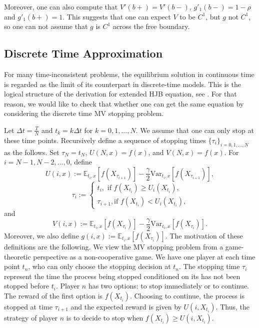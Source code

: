 \documentclass[11pt]{article}
\begin{document}
Moreover, one can also compute that $V'(b+)=V'(b-)$, $g'_1(b-)=1-\rho$ and $g'_1(b+)=1$. This suggests that one can expect $V$ to be $C^1$, but $g$  not $C^1$, so  one can not assume that $g$ is $C^1$ across the free boundary.
\subsection{Discrete Time Approximation}
For many time-inconsistent problems, the equilibrium solution in continuous time is regarded as the limit of its counterpart in discrete-time models. This is the logical structure of the derivation for extended HJB equation, see \cite{bjork2021time}.  For that reason, we would like to check that whether one can get the same equation by considering the discrete time  MV stopping problem. 

Let $\Delta t=\frac{T}{N}$ and $t_k=k\Delta t$ for $k=0,1,...,N$. We assume that one can only stop at these time points. Recursively  define a sequence of stopping times $\{\tau_i\}_{i=0,1,...,N}$ as the follows. Set $\tau_N=t_N$, $U(N,x)=f(x)$, and $V(N,x)=f(x)$. For $i=N-1,N-2,...,0$, define 
$$
U(i,x):=\mathbb E_{t_i,x}[f(X_{\tau_{i+1}})]-\frac{\gamma}{2} \text{Var}_{t_i,x}[f(X_{\tau_{i+1}})],
$$
\begin{equation*}
\tau_i:=\left\{
\begin{matrix}
t_i,\text{ if $f(X_{t_i}) \ge U_{i}(X_{t_i})$,}\\
\tau_{i+1},\text{if $f(X_{t_i}) < U_{i}(X_{t_i})$,}
\end{matrix}
\right. 
\end{equation*}
and 
$$
V(i,x):=\mathbb E_{t_i,x}[f(X_{\tau_{i}})]-\frac{\gamma}{2} \text{Var}_{t_i,x}[f(X_{\tau_{i}})].
$$
Moreover, we also define $g(i,x):=\mathbb E_{t_i,x}[f(X_{\tau_{i}})]$. The motivation of these definitions are the following.  We view the  MV stopping problem from a game-theoretic perspective as  a non-cooperative game. We have one player at each time point  $t_n$, who can only choose the stopping decision at $t_n$. The stopping time $\tau_i$ represent the time the process being stopped conditioned on its has not been stopped before $t_i$. Player $n$ has two options: to stop immediately or to continue. The reward of the first option is $f(X_{t_i})$. Choosing to continue, the process  is stopped at time $\tau_{i+1}$ and the expected reward is given  by $U(i,X_{t_i})$. Thus, the strategy of player $n$ is to decide to stop  when $f(X_{t_i}) \ge U(i,X_{t_i})$.  
  
\end{document}
